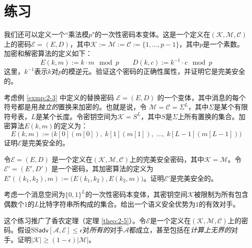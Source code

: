 \section{练习}

\begin{exercise}[乘性一次性密码本]
我们还可以定义一个``乘法模$p$"的一次性密码本变体。这是一个定义在$(\mathcal{K},\mathcal{M},\mathcal{C})$上的密码$\mathcal{E}=(E,D)$，其中$\mathcal{K}:=\mathcal{M}:=\mathcal{C}:=\{1,\dots,p-1\}$，其中$p$是一个素数。加密和解密算法的定义如下：
\[
E(k,m):=k\cdot m \mod p\quad\quad
D(k,c):=k^{-1}\cdot c \mod p
\]
这里，$k^{-1}$表示$k$对$p$的模逆元。验证这个密码的正确性属性，并证明它是完美安全的。
\end{exercise}

\begin{exercise}[一个好的替换密码]
考虑例 \ref{exmp:2-3} 中定义的替换密码 $\mathcal{E}=(E,D)$ 的一个变体，其中消息的每个符号都是用\emph{独立的}置换来加密的。也就是说，令 $\mathcal{M}=\mathcal{C}=\Sigma^L$，其中$\Sigma$是某个有限符号表，$L$是某个长度。令密钥空间为$\mathcal{K}=S^L$，其中$S$是$\Sigma$上所有置换的集合。加密算法$E(k, m)$的定义为：
\[
E(k,m):=\Big(k[0](m[0]),\;k[1](m[1]),\;\dots,\;k[L-1](m[L-1])\Big)
\]
证明$\mathcal{E}$是完美安全的。
\end{exercise}

\begin{exercise}[链式加密]
令$\mathcal{E}=(E,D)$ 是一个定义在$(\mathcal{K},\mathcal{M},\mathcal{C})$上的完美安全密码，其中$\mathcal{K}=\mathcal{M}$。令$\mathcal{E}'=(E',D')$ 是一个密码，其加密算法的定义为 $E'((k_1,k_2),m):=\big(E(k_1,k_2),E(k_2,m)\big)$。证明$\mathcal{E}'$是完美安全的。
\end{exercise}

\begin{exercise}[被破坏的一次性密码本]
考虑一个消息空间为$\{0,1\}^L$的一次性密码本变体，其密钥空间$\mathcal{K}$被限制为所有包含偶数个$1$的$L$比特字符串所构成的集合。给出一个语义安全优势为$1$的有效对手。
\end{exercise}

\begin{exercise}[更强的不可能结果]
这个练习推广了香农定理（定理 \ref{theo:2-5}）。令$\mathcal{E}$是一个定义在$(\mathcal{K},\mathcal{M},\mathcal{C})$上的密码。假设$\mathrm{SS}\mathsf{adv}[\mathcal{A},\mathcal{E}]\leq\epsilon$对\emph{所有的}对手$\mathcal{A}$都成立，甚至包括在\emph{计算上无界的}对手。证明$|\mathcal{K}|\geq(1-\epsilon)|\mathcal{M}|$。
\end{exercise}

